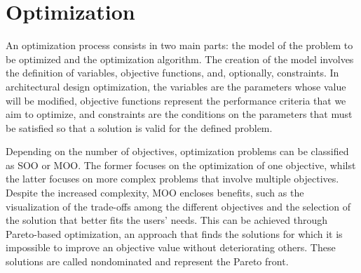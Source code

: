 \section{Optimization}
\label{sec:backg}
An optimization process consists in two main parts: the model of the problem to be optimized and the optimization algorithm. The creation of the model involves the definition of variables, objective functions, and, optionally, constraints. In architectural design optimization, the variables are the parameters whose value will be modified, objective functions represent the performance criteria that we aim to optimize, and constraints are the conditions on the parameters that must be satisfied so that a solution is valid for the defined problem.

Depending on the number of objectives, optimization problems can be classified as \ac{SOO} or \ac{MOO}. The former focuses on the optimization of one objective, whilst the latter focuses on more complex problems that involve multiple objectives.
Despite the increased complexity, \ac{MOO} encloses benefits, such as the visualization of the trade-offs among the different objectives and the selection of the solution that better fits the users' needs. This can be achieved through Pareto-based optimization, an approach that finds the solutions for which it is impossible to improve an objective value without deteriorating others. These solutions are called nondominated and represent the Pareto front. 


